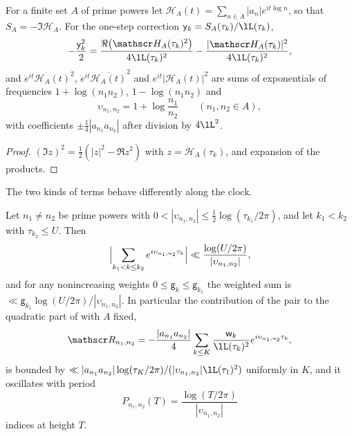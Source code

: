 \begin{proposition}\label{prop:product_quotient}
For a finite set $A$ of prime powers let $\mathscr H_A(t)=\sum_{n\in A}|a_n|e^{it\log n}$, so that $S_A=-\Im\mathscr H_A$. For the one-step correction $\mathsf y_k=S_A(\tau_k)/\lL(\tau_k)$,
\begin{equation}
-\frac{\mathsf y_k^2}2=\frac{\Re\bigl(\mathscr H_A(\tau_k)^2\bigr)}{4\lL(\tau_k)^2}-\frac{|\mathscr H_A(\tau_k)|^2}{4\lL(\tau_k)^2},
\label{eq:product_quotient}
\end{equation}
and $e^{it}\mathscr H_A(t)^2$, $e^{it}\overline{\mathscr H_A(t)}^2$ and $e^{it}|\mathscr H_A(t)|^2$ are sums of exponentials of frequencies $1+\log(n_1n_2)$, $1-\log(n_1n_2)$ and
\begin{equation}
\upsilon_{n_1,n_2}=1+\log\frac{n_1}{n_2}\qquad(n_1,n_2\in A),
\label{eq:quotient_frequency}
\end{equation}
with coefficients $\pm\frac14|a_{n_1}a_{n_2}|$ after division by $4\lL^2$.
\end{proposition}

\begin{proof}
$(\Im z)^2=\frac12(|z|^2-\Re z^2)$ with $z=\mathscr H_A(\tau_k)$, and expansion of the products.
\end{proof}

The two kinds of terms behave differently along the clock.

\begin{proposition}\label{prop:quotient_modes}
Let $n_1\ne n_2$ be prime powers with $0<|\upsilon_{n_1,n_2}|\le\frac12\log(\tau_{k_1}/2\pi)$, and let $k_1<k_2$ with $\tau_{k_2}\le U$. Then
\begin{equation}
\Bigl|\sum_{k_1<k\le k_2}e^{i\upsilon_{n_1,n_2}\tau_k}\Bigr|\ll\frac{\log(U/2\pi)}{|\upsilon_{n_1,n_2}|},
\label{eq:quotient_mode}
\end{equation}
and for any nonincreasing weights $0\le\mathsf g_k\le\mathsf g_{k_1}$ the weighted sum is $\ll\mathsf g_{k_1}\log(U/2\pi)/|\upsilon_{n_1,n_2}|$. In particular the contribution of the pair to the quadratic part of  with $A$ fixed,
\begin{equation}
\mathscr R_{n_1,n_2}=-\frac{|a_{n_1}a_{n_2}|}4\sum_{k\le K}\frac{\mathsf w_k}{\lL(\tau_k)^2}e^{i\upsilon_{n_1,n_2}\tau_k},
\label{eq:quotient_contribution}
\end{equation}
is bounded by $\ll|a_{n_1}a_{n_2}|\log(\tau_K/2\pi)/(|\upsilon_{n_1,n_2}|\lL(\tau_1)^2)$ uniformly in $K$, and it oscillates with period
\begin{equation}
P_{n_1,n_2}(T)=\frac{\log(T/2\pi)}{|\upsilon_{n_1,n_2}|}
\label{eq:quotient_period}
\end{equation}
indices at height $T$.
\end{proposition}

